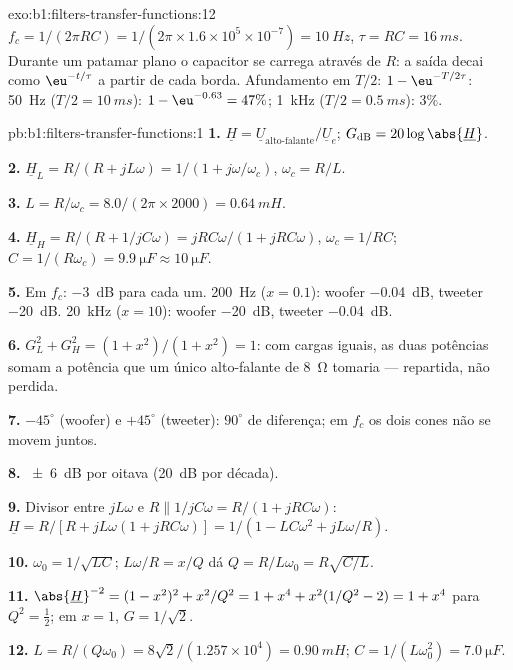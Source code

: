 \begin{solution}{exo:b1:filters-transfer-functions:12}
$f_c = 1/(2\pi RC) = 1/(2\pi \times 1.6\times10^5 \times 10^{-7}) =
\qty{10}{Hz}$, $\tau = RC = \qty{16}{ms}$. Durante um patamar plano o
capacitor se carrega através de $R$: a saída decai como $\eu^{-t/\tau}$
a partir de cada borda. Afundamento em $T/2$: $1 - \eu^{-T/2\tau}$: \qty{50}{Hz}
($T/2 = \qty{10}{ms}$): $1 - \eu^{-0.63} = 47\%$; \qty{1}{kHz}
($T/2 = \qty{0.5}{ms}$): $3\%$.
\end{solution}

\begin{solution}{pb:b1:filters-transfer-functions:1}
\textbf{1.} $\underline H = \underline U_{\text{alto-falante}}/\underline U_e$;
$G_{\mathrm{dB}} = 20\log\abs{\underline H}$.

\textbf{2.} $\underline H_L = R/(R + jL\omega) = 1/(1 + j\omega/\omega_c)$,
$\omega_c = R/L$.

\textbf{3.} $L = R/\omega_c = 8.0/(2\pi \times 2000) = \qty{0.64}{mH}$.

\textbf{4.} $\underline H_H = R/(R + 1/jC\omega) = jRC\omega/(1 + jRC\omega)$,
$\omega_c = 1/RC$; $C = 1/(R\omega_c) = \qty{9.9}{\micro F} \approx
\qty{10}{\micro F}$.

\textbf{5.} Em $f_c$: \qty{-3}{dB} para cada um. \qty{200}{Hz} ($x = 0.1$): woofer
\qty{-0.04}{dB}, tweeter \qty{-20}{dB}. \qty{20}{kHz} ($x = 10$): woofer
\qty{-20}{dB}, tweeter \qty{-0.04}{dB}.

\textbf{6.} $G_L^2 + G_H^2 = (1 + x^2)/(1 + x^2) = 1$: com cargas iguais,
as duas potências somam a potência que um único alto-falante de \qty{8}{\ohm}
tomaria --- repartida, não perdida.

\textbf{7.} $-45^\circ$ (woofer) e $+45^\circ$ (tweeter): $90^\circ$
de diferença; em $f_c$ os dois cones não se movem juntos.

\textbf{8.} \qty{\pm 6}{dB} por oitava (\qty{20}{dB} por década).

\textbf{9.} Divisor entre $jL\omega$ e $R \parallel 1/jC\omega =
R/(1 + jRC\omega)$: $\underline H = R/[R + jL\omega(1 + jRC\omega)] =
1/(1 - LC\omega^2 + jL\omega/R)$.

\textbf{10.} $\omega_0 = 1/\sqrt{LC}$; $L\omega/R = x/Q$ dá $Q =
R/L\omega_0 = R\sqrt{C/L}$.

\textbf{11.} $\abs{\underline H}^{-2} = (1 - x^2)^2 + x^2/Q^2 = 1 + x^4 +
x^2(1/Q^2 - 2) = 1 + x^4$ para $Q^2 = \tfrac12$; em $x = 1$, $G = 1/\sqrt2$.

\textbf{12.} $L = R/(Q\omega_0) = 8\sqrt2/(1.257\times10^4) = \qty{0.90}{mH}$;
$C = 1/(L\omega_0^2) = \qty{7.0}{\micro F}$.


\end{solution}
